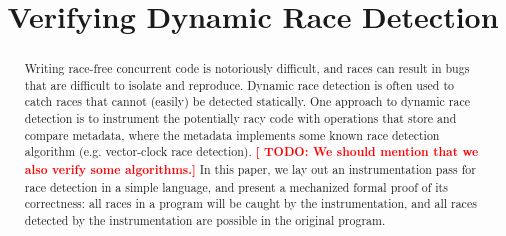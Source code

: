 \documentclass[preprint, 10pt]{sigplanconf}
\newcommand{\TODO}[1]{\textbf{\textcolor{red}{[ TODO: #1]}}}
\newcommand{\ignore}[1]{}
\begin{document}
\setlength{\pdfpageheight}{\paperheight}
\setlength{\pdfpagewidth}{\paperwidth}





\titlebanner{}        %
\preprintfooter{}   %

\title{Verifying Dynamic Race Detection}
\ignore{\authorinfo{William Mansky \and Yuanfeng Peng \and Steve Zdancewic \and Joseph Devietti}
           {University of Pennsylvania}
           {wmansky@seas.upenn.edu, yuanfeng@cis.upenn.edu, stevez@cis.upenn.edu, devietti@cis.upenn.edu}}
\authorinfo{}{}{}
\maketitle

\begin{abstract}
Writing race-free concurrent code is notoriously difficult, and races can result in bugs that are difficult to isolate and reproduce. Dynamic race detection is often used to catch races that cannot (easily) be detected statically. One approach to dynamic race detection is to instrument the potentially racy code with operations that store and compare metadata, where the metadata implements some known race detection algorithm (e.g. vector-clock race detection). \TODO{We should mention that we also verify some algorithms.} In this paper, we lay out an instrumentation pass for race detection in a simple language, and present a mechanized formal proof of its correctness: all races in a program will be caught by the instrumentation, and all races detected by the instrumentation are possible in the original program.
\end{abstract}

\end{document}
